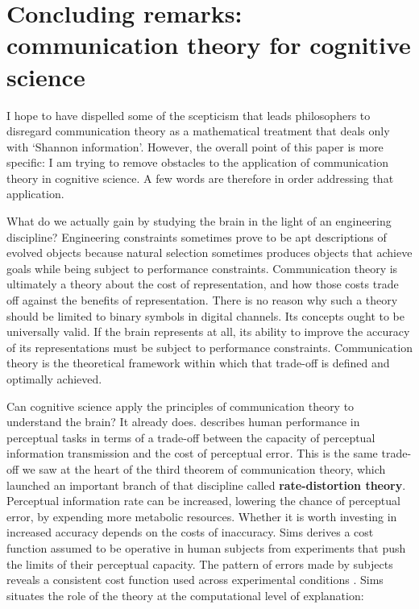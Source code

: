 \section{\sloppy Concluding remarks: communication theory for cognitive science}\label{sec:conclusion}

I hope to have dispelled some of the scepticism that leads philosophers to disregard communication theory as a mathematical treatment that deals only with `Shannon information'.
However, the overall point of this paper is more specific: I am trying to remove obstacles to the application of communication theory in cognitive science.
A few words are therefore in order addressing that application.

What do we actually gain by studying the brain in the light of an engineering discipline?
Engineering constraints sometimes prove to be apt descriptions of evolved objects because natural selection sometimes produces objects that achieve goals while being subject to performance constraints.
Communication theory is ultimately a theory about the cost of representation, and how those costs trade off against the benefits of representation.
There is no reason why such a theory should be limited to binary symbols in digital channels.
Its concepts ought to be universally valid.
If the brain represents at all, its ability to improve the accuracy of its representations must be subject to performance constraints.
Communication theory is the theoretical framework within which that trade-off is defined and optimally achieved.

Can cognitive science apply the principles of communication theory to understand the brain?
It already does.
\citet{sims2016ratedistortion} describes human performance in perceptual tasks in terms of a trade-off between the capacity of perceptual information transmission and the cost of perceptual error.
This is the same trade-off we saw at the heart of the third theorem of communication theory, which launched an important branch of that discipline called \textbf{rate-distortion theory}.
Perceptual information rate can be increased, lowering the chance of perceptual error, by expending more metabolic resources.
Whether it is worth investing in increased accuracy depends on the costs of inaccuracy.
Sims derives a cost function assumed to be operative in human subjects from experiments that push the limits of their perceptual capacity.
The pattern of errors made by subjects reveals a consistent cost function used across experimental conditions \citep[188]{sims2016ratedistortion}.
Sims situates the role of the theory at the computational level of explanation:

